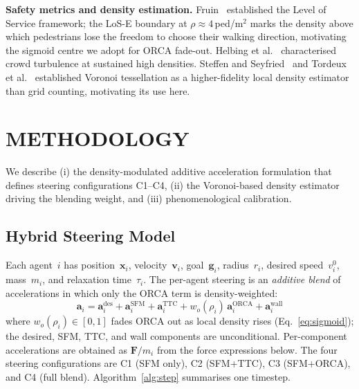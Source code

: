 \documentclass[a4paper,twoside]{article}
\begin{document}
\textbf{Safety metrics and density estimation.}
Fruin~\cite{Fruin71} established the Level of Service framework; the LoS-E boundary at $\rho\approx 4$\,ped/m$^2$ marks the density above which pedestrians lose the freedom to choose their walking direction, motivating the sigmoid centre we adopt for ORCA fade-out. Helbing et al.~\cite{Helbing07} characterised crowd turbulence at sustained high densities. Steffen and Seyfried~\cite{Steffen10} and Tordeux et al.~\cite{Tordeux15} established Voronoi tessellation as a higher-fidelity local density estimator than grid counting, motivating its use here.


\section{\uppercase{Methodology}}
\label{sec:framework}

We describe (i) the density-modulated additive acceleration formulation that defines steering configurations C1--C4, (ii) the Voronoi-based density estimator driving the blending weight, and (iii) phenomenological calibration.

\subsection{Hybrid Steering Model}
\label{sec:hybrid}

Each agent~$i$ has position~$\mathbf{x}_i$, velocity~$\mathbf{v}_i$, goal~$\mathbf{g}_i$, radius~$r_i$, desired speed~$v_i^0$, mass~$m_i$, and relaxation time~$\tau_i$. The per-agent steering is an \emph{additive blend} of accelerations in which only the ORCA term is density-weighted:
\begin{equation}\label{eq:hybrid}
    \mathbf{a}_i = \mathbf{a}_i^{\text{des}} + \mathbf{a}_i^{\text{SFM}} + \mathbf{a}_i^{\text{TTC}} + w_o(\rho_i)\,\mathbf{a}_i^{\text{ORCA}} + \mathbf{a}_i^{\text{wall}}
\end{equation}
where $w_o(\rho_i)\in[0,1]$ fades ORCA out as local density rises (Eq.~\ref{eq:sigmoid}); the desired, SFM, TTC, and wall components are unconditional. Per-component accelerations are obtained as $\mathbf{F}/m_i$ from the force expressions below. The four steering configurations are C1 (SFM only), C2 (SFM+TTC), C3 (SFM+ORCA), and C4 (full blend). Algorithm~\ref{alg:step} summarises one timestep.
\end{document}
